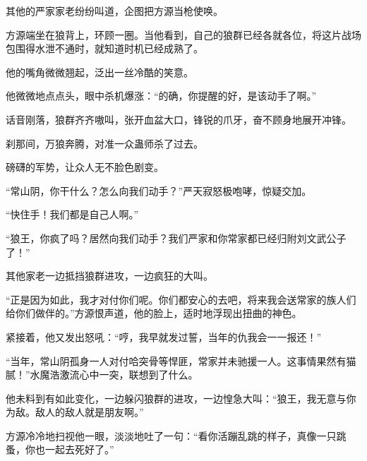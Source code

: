 \begin{this_body}
其他的严家家老纷纷叫道，企图把方源当枪使唤。

方源端坐在狼背上，环顾一圈。当他看到，自己的狼群已经各就各位，将这片战场包围得水泄不通时，就知道时机已经成熟了。

他的嘴角微微翘起，泛出一丝冷酷的笑意。

他微微地点点头，眼中杀机爆涨：“的确，你提醒的好，是该动手了啊。”

话音刚落，狼群齐齐嗷叫，张开血盆大口，锋锐的爪牙，奋不顾身地展开冲锋。

刹那间，万狼奔腾，对准一众蛊师杀了过去。

磅礴的军势，让众人无不脸色剧变。

“常山阴，你干什么？怎么向我们动手？”严天寂怒极咆哮，惊疑交加。

“快住手！我们都是自己人啊。”

“狼王，你疯了吗？居然向我们动手？我们严家和你常家都已经归附刘文武公子了！”

其他家老一边抵挡狼群进攻，一边疯狂的大叫。

“正是因为如此，我才对付你们呢。你们都安心的去吧，将来我会送常家的族人们给你们做伴的。”方源恨声道，他的脸上，适时地浮现出扭曲的神色。

紧接着，他又发出怒吼：“哼，我早就发过誓，当年的仇我会一一报还！”

“当年，常山阴孤身一人对付哈突骨等悍匪，常家并未驰援一人。这事情果然有猫腻！”水魔浩激流心中一突，联想到了什么。

他未料到有如此变化，一边躲闪狼群的进攻，一边惶急大叫：“狼王，我无意与你为敌。敌人的敌人就是朋友啊。”

方源冷冷地扫视他一眼，淡淡地吐了一句：“看你活蹦乱跳的样子，真像一只跳蚤，你也一起去死好了。”

\end{this_body}

